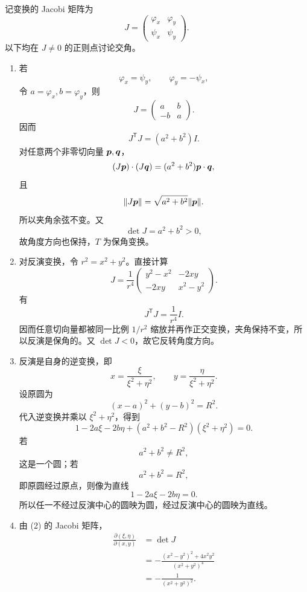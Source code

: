 \begin{xsolution}
记变换的 Jacobi 矩阵为
\[
  J=\begin{pmatrix}
  \varphi_x&\varphi_y\\
  \psi_x&\psi_y
  \end{pmatrix}.
\]
以下均在 $J\ne0$ 的正则点讨论交角。

\begin{enumerate}[label=(\arabic*)]
  \item 若
  \[
    \varphi_x=\psi_y,
    \qquad
    \varphi_y=-\psi_x,
  \]
  令 $a=\varphi_x,b=\varphi_y$，则
  \[
    J=\begin{pmatrix}a&b\\-b&a\end{pmatrix}.
  \]
  因而
  \[
    J^{\mathsf T}J=(a^2+b^2)I.
  \]
  对任意两个非零切向量 $\bm{p},\bm{q}$，
  \[
    (J\bm{p})\cdot(J\bm{q})
    =(a^2+b^2)\bm{p}\cdot\bm{q},
  \]
  且
  \[
    \lVert J\bm{p}\rVert=\sqrt{a^2+b^2}\lVert\bm{p}\rVert.
  \]
  所以夹角余弦不变。又
  \[
    \det J=a^2+b^2>0,
  \]
  故角度方向也保持，$T$ 为保角变换。

  \item 对反演变换，令 $r^2=x^2+y^2$。直接计算
  \[
    J=\frac1{r^4}
    \begin{pmatrix}
      y^2-x^2&-2xy\\
      -2xy&x^2-y^2
    \end{pmatrix}.
  \]
  有
  \[
    J^{\mathsf T}J=\frac1{r^4}I.
  \]
  因而任意切向量都被同一比例 $1/r^2$ 缩放并再作正交变换，夹角保持不变，所以反演是保角的。又 $\det J<0$，故它反转角度方向。

  \item 反演是自身的逆变换，即
  \[
    x=\frac{\xi}{\xi^2+\eta^2},
    \qquad
    y=\frac{\eta}{\xi^2+\eta^2}.
  \]
  设原圆为
  \[
    (x-a)^2+(y-b)^2=R^2.
  \]
  代入逆变换并乘以 $\xi^2+\eta^2$，得到
  \[
    1-2a\xi-2b\eta
    +(a^2+b^2-R^2)(\xi^2+\eta^2)=0.
  \]
  若
  \[
    a^2+b^2\ne R^2,
  \]
  这是一个圆；若
  \[
    a^2+b^2=R^2,
  \]
  即原圆经过原点，则像为直线
  \[
    1-2a\xi-2b\eta=0.
  \]
  所以任一不经过反演中心的圆映为圆，经过反演中心的圆映为直线。

  \item 由 (2) 的 Jacobi 矩阵，
  \[
  \begin{aligned}
    \frac{\partial(\xi,\eta)}{\partial(x,y)}
    &=\det J\\
    &=-\frac{(x^2-y^2)^2+4x^2y^2}{(x^2+y^2)^4}\\
    &=-\frac1{(x^2+y^2)^2}.
  \end{aligned}
  \]


\end{enumerate}
\end{xsolution}
